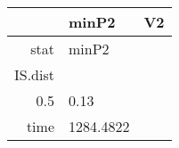 \begin{table}[ht]
\centering
\begingroup\tiny
\begin{tabular}{rll}
  \hline
 & minP2 & V2 \\ 
  \hline
stat & minP2 &  \\ 
  IS.dist &  &  \\ 
  0.5 & 0.13 &  \\ 
  time & 1284.4822 &  \\ 
   \hline
\end{tabular}
\endgroup
\end{table}
